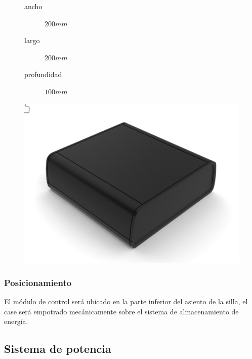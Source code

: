 \begin{figure}
\centering
\begin{minipage}{.3\textwidth}
  \centering
  \begin{description}
    \item[ancho] $200mm$
    \item[largo] $200mm$
    \item[profundidad] $100mm$
  \end{description}
\end{minipage}%
\begin{minipage}{.7\textwidth}
  \centering
  \includegraphics[width=\linewidth]{Figures/enclousure.png}
  \label{fig:enclousure}
\end{minipage}
\end{figure}

\subsubsection{Posicionamiento}

El m\'odulo de control ser\'a ubicado en la parte inferior del asiento de la
silla, el case ser\'a empotrado mec\'anicamente sobre el sistema de
almacenamiento de energ\'ia.

\subsection{Sistema de potencia}

